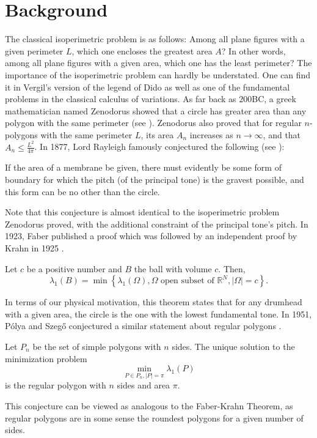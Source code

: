\section{Background}
The classical isoperimetric problem is as follows: Among all plane figures with a given perimeter $L$, which one encloses the greatest area $A$?
In other words, among all plane figures with a given area, which one has the least perimeter?
The importance of the isoperimetric problem can hardly be understated.
One can find it in Vergil's version of the legend of Dido as well as one of the fundamental problems in the classical calculus of variations.
As far back as $200$BC, a greek mathematician named Zenodorus showed that a circle has greater area than any polygon with the same perimeter (see \cite{pappus}).
Zenodorus also proved that for regular $n $-polygons with the same perimeter $L$, its area $A_{n}$ increases as $n \to \infty$, and that $A_{n} \leq \frac{L^{2}}{4\pi}$.
In 1877, Lord Rayleigh famously conjectured the following (see \cite{rayleigh}):
\begin{conjecture}
If the area of a membrane be given, there must evidently be some
form of boundary for which the pitch (of the principal tone) is the
gravest possible, and this form can be no other than the circle.
\end{conjecture}
Note that this conjecture is almost identical to the isoperimetric problem Zenodorus proved, with the additional constraint of the principal tone's pitch.
In 1923, Faber published a proof which was followed by an independent proof by Krahn in 1925 \cite{krahn}.
\begin{theorem}
 Let $c$ be a positive number and $B$ the ball with volume $c$. Then,
 \[
   \lambda_{1}(B) = \min \left\{ \lambda_{1}(\Omega), \Omega \text{ open subset of } \mathbb{R}^{N}, |\Omega| = c \right\} 
 .\] 
\end{theorem}
In terms of our physical motivation, this theorem states that for any drumhead with a given area, the circle is the one with the lowest fundamental tone.
In 1951, Pólya and Szegő conjectured a similar statement about regular polygons \cite{polya}.
\begin{conjecture}
Let $P_{n}$ be the set of simple polygons with $n$ sides.
The unique solution to the minimization problem
$$
\min_{P \in P_{n},|P|=\pi} \lambda_{1} (P)
$$
is the regular polygon with $n$ sides and area $\pi$.
\end{conjecture}
This conjecture can be viewed as analogous to the Faber-Krahn Theorem, as regular polygons are in some sense the roundest polygons for a given number of sides.
